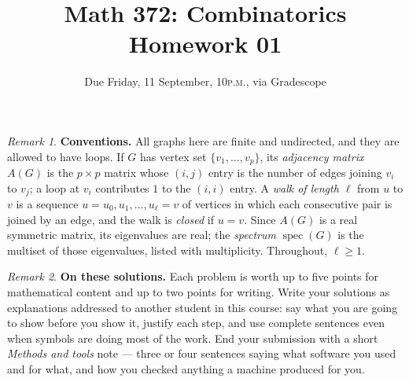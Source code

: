 \documentclass[11pt,twoside]{amsart}
\title{Math 372: Combinatorics\\ Homework 01}
\author{Due Friday, 11 September, 10\textsc{p.m.}, via Gradescope}
\theoremstyle{plain}
\theoremstyle{remark}
\newtheorem*{rmk*}{Remark}
\theoremstyle{definition}
\theoremstyle{definition}
\newcommand{\spec}{\operatorname{spec}}
\begin{document}
\maketitle

\begin{rmk*}
\textbf{Conventions.} All graphs here are finite and undirected, and they are allowed to have
loops. If $G$ has vertex set $\{v_1,\dots,v_p\}$, its \emph{adjacency matrix} $A(G)$ is the
$p\times p$ matrix whose $(i,j)$ entry is the number of edges joining $v_i$ to $v_j$; a loop at
$v_i$ contributes $1$ to the $(i,i)$ entry. A \emph{walk of length $\ell$} from $u$ to $v$ is a
sequence $u=u_0,u_1,\dots,u_\ell=v$ of vertices in which each consecutive pair is joined by an
edge, and the walk is \emph{closed} if $u=v$. Since $A(G)$ is a real symmetric matrix, its
eigenvalues are real; the \emph{spectrum} $\spec(G)$ is the multiset of those eigenvalues, listed
with multiplicity. Throughout, $\ell\ge 1$.
\end{rmk*}

\begin{rmk*}
\textbf{On these solutions.} Each problem is worth up to five points for mathematical content
and up to two points for writing. Write your solutions as explanations addressed to another
student in this course: say what you are going to show before you show it, justify each step,
and use complete sentences even when symbols are doing most of the work. End your submission
with a short \emph{Methods and tools} note --- three or four sentences saying what software you
used and for what, and how you checked anything a machine produced for you.
\end{rmk*}
\end{document}
